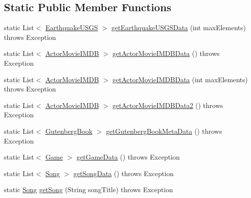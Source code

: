 \subsection*{Static Public Member Functions}
\begin{DoxyCompactItemize}
\item 
static List$<$ \hyperlink{classbridges_1_1data__src__dependent_1_1_earthquake_u_s_g_s}{Earthquake\+U\+S\+G\+S} $>$ \hyperlink{classbridges_1_1connect_1_1_bridges_a58bef23cd12872c6ae5d7358b7485a2b}{get\+Earthquake\+U\+S\+G\+S\+Data} (int max\+Elements)  throws Exception 
\item 
static List$<$ \hyperlink{classbridges_1_1data__src__dependent_1_1_actor_movie_i_m_d_b}{Actor\+Movie\+I\+M\+D\+B} $>$ \hyperlink{classbridges_1_1connect_1_1_bridges_af35f7a4548f1aec8f208a56e1c74b5aa}{get\+Actor\+Movie\+I\+M\+D\+B\+Data} ()  throws Exception 
\item 
static List$<$ \hyperlink{classbridges_1_1data__src__dependent_1_1_actor_movie_i_m_d_b}{Actor\+Movie\+I\+M\+D\+B} $>$ \hyperlink{classbridges_1_1connect_1_1_bridges_a76280ef69f0205e3711b18617e5c7646}{get\+Actor\+Movie\+I\+M\+D\+B\+Data} (int max\+Elements)  throws Exception 
\item 
static List$<$ \hyperlink{classbridges_1_1data__src__dependent_1_1_actor_movie_i_m_d_b}{Actor\+Movie\+I\+M\+D\+B} $>$ \hyperlink{classbridges_1_1connect_1_1_bridges_a7a5f5efc6712ead5babe4cd21a4de3cc}{get\+Actor\+Movie\+I\+M\+D\+B\+Data2} ()  throws Exception 
\item 
static List$<$ \hyperlink{classbridges_1_1data__src__dependent_1_1_gutenberg_book}{Gutenberg\+Book} $>$ \hyperlink{classbridges_1_1connect_1_1_bridges_a7847b5a45cae8491acd5b6fb0015415b}{get\+Gutenberg\+Book\+Meta\+Data} ()  throws Exception 
\item 
static List$<$ \hyperlink{classbridges_1_1data__src__dependent_1_1_game}{Game} $>$ \hyperlink{classbridges_1_1connect_1_1_bridges_a594808b9dada5c825ac00ae0c97c9e9b}{get\+Game\+Data} ()  throws Exception 
\item 
static List$<$ \hyperlink{classbridges_1_1data__src__dependent_1_1_song}{Song} $>$ \hyperlink{classbridges_1_1connect_1_1_bridges_a5bcfed7f065d3c9da31e3551bf31ec7c}{get\+Song\+Data} ()  throws Exception 
\item 
static \hyperlink{classbridges_1_1data__src__dependent_1_1_song}{Song} \hyperlink{classbridges_1_1connect_1_1_bridges_a7f65e6648f9e66a02343a39f2fc425cb}{get\+Song} (String song\+Title)  throws Exception 
\item 

\end{DoxyCompactItemize}
